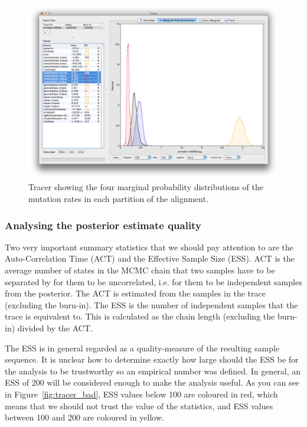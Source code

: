 \documentclass[11pt]{article}
\begin{document}
\begin{figure}[H]
\centering
\includegraphics[width=5in]{figures/tracer_comparison.png}
\caption{\small Tracer showing the four marginal probability distributions of the mutation rates in each partition of the alignment.}
\label{fig:tracer_comparison}
\end{figure}

\subsubsection{Analysing the posterior estimate quality}

Two very important summary statistics that we should pay attention to are the Auto-Correlation Time (ACT) and the Effective Sample Size (ESS). ACT is the average number of states in the MCMC chain that two samples have to be separated by for them to be uncorrelated, i.e. for them to be independent samples from the posterior. The ACT is estimated from the samples in the trace (excluding the burn-in). The ESS is the number of independent samples that the trace is equivalent to. This is calculated as the chain length (excluding the burn-in) divided by the ACT.

The ESS is in general regarded as a quality-measure of the resulting sample sequence. It is unclear how to determine exactly how large should the ESS be for the analysis to be trustworthy so an empirical number was defined. In general, an ESS of 200 will be considered enough to make the analysis useful. As you can see in Figure~\ref{fig:tracer_bad}, ESS values below 100 are coloured in red, which means that we should not trust the value of the statistics, and ESS values between 100 and 200 are coloured in yellow.
\end{document}
